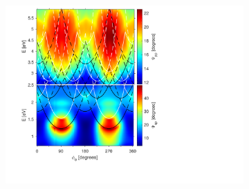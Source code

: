 \begin{figure}[h]  %
    \begin{subfigure}{\textwidth}
        \centering
        \includegraphics[width=0.5\linewidth, trim=1.2cm  1.8cm 6.5cm 0.3cm, clip]{figures/ch4/S5B/exp/S5B_Psi_pp_exp_55.pdf}
        \caption{}
    \end{subfigure}
    

\end{figure}
